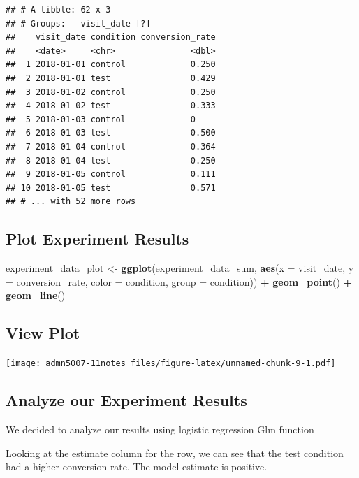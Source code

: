 \documentclass[]{article}
\newenvironment{Shaded}{\begin{snugshade}}{\end{snugshade}}
\newcommand{\KeywordTok}[1]{\textcolor[rgb]{0.13,0.29,0.53}{\textbf{#1}}}
\newcommand{\DataTypeTok}[1]{\textcolor[rgb]{0.13,0.29,0.53}{#1}}
\newcommand{\StringTok}[1]{\textcolor[rgb]{0.31,0.60,0.02}{#1}}
\newcommand{\OperatorTok}[1]{\textcolor[rgb]{0.81,0.36,0.00}{\textbf{#1}}}
\newcommand{\NormalTok}[1]{#1}
\begin{document}
\begin{verbatim}
## # A tibble: 62 x 3
## # Groups:   visit_date [?]
##    visit_date condition conversion_rate
##    <date>     <chr>               <dbl>
##  1 2018-01-01 control             0.250
##  2 2018-01-01 test                0.429
##  3 2018-01-02 control             0.250
##  4 2018-01-02 test                0.333
##  5 2018-01-03 control             0    
##  6 2018-01-03 test                0.500
##  7 2018-01-04 control             0.364
##  8 2018-01-04 test                0.250
##  9 2018-01-05 control             0.111
## 10 2018-01-05 test                0.571
## # ... with 52 more rows
\end{verbatim}

\subsection{Plot Experiment Results}\label{plot-experiment-results}

\begin{Shaded}
\begin{Highlighting}[]
\NormalTok{experiment_data_plot <-}\StringTok{ }\KeywordTok{ggplot}\NormalTok{(experiment_data_sum, }
       \KeywordTok{aes}\NormalTok{(}\DataTypeTok{x =}\NormalTok{ visit_date, }\DataTypeTok{y =}\NormalTok{ conversion_rate, }
           \DataTypeTok{color =}\NormalTok{ condition, }
           \DataTypeTok{group =}\NormalTok{ condition)) }\OperatorTok{+}
\StringTok{  }\KeywordTok{geom_point}\NormalTok{() }\OperatorTok{+}
\StringTok{  }\KeywordTok{geom_line}\NormalTok{()}
\end{Highlighting}
\end{Shaded}

\subsection{View Plot}\label{view-plot-1}

\texttt{[image: admn5007-11notes\_files/figure-latex/unnamed-chunk-9-1.pdf]}

\subsection{Analyze our Experiment
Results}\label{analyze-our-experiment-results}

We decided to analyze our results using logistic regression Glm function

Looking at the estimate column for the row, we can see that the test
condition had a higher conversion rate. The model estimate is positive.
\end{document}

